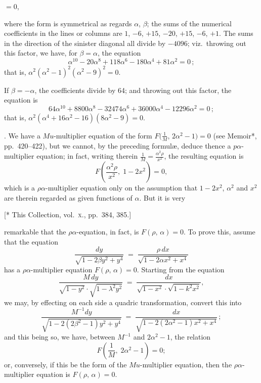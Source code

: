 \documentclass[11pt]{article}
\begin{document}
\noindent\hfill $= 0$,

\medskip

\noindent where the form is symmetrical as regards $\alpha$, $\beta$; the sums of the numerical coefficients in the lines or columns are $1$, $-6$, $+15$, $-20$, $+15$, $-6$, $+1$. The sums in the direction of the sinister diagonal all divide by $-4096$; viz.\ throwing out this factor, we have, for $\beta = \alpha$, the equation
\[
\alpha^{10} - 20\alpha^8 + 118\alpha^6 - 180\alpha^4 + 81\alpha^2 = 0\,;
\]
that is, $\alpha^2(\alpha^2 - 1)^2(\alpha^2 - 9)^2 = 0$.

\medskip

\noindent If $\beta = -\alpha$, the coefficients divide by 64; and throwing out this factor, the equation is
\[
64\alpha^{10} + 8800\alpha^8 - 32474\alpha^6 + 36000\alpha^4 - 12296\alpha^2 = 0\,;
\]
that is, $\alpha^2(\alpha^4 + 16\alpha^2 - 16)(8\alpha^2 - 9) = 0$.

\medskip

. We have a $M u$-multiplier equation of the form $F\!\bigl(\frac{1}{M},\,2\alpha^2 - 1\bigr) = 0$ (see Memoir*, pp.\ 420--422), but we cannot, by the preceding formul\ae{}, deduce thence a $p\alpha$-multiplier equation; in fact, writing therein $\frac{1}{M} = \frac{\alpha^2\rho}{x^2}$, the resulting equation is
\[
F\!\left(\frac{\alpha^2\rho}{x^2},\;1 - 2x^2\right) = 0,
\]
which is a $\rho\alpha$-multiplier equation only on the assumption that $1 - 2x^2$, $\alpha^2$ and $x^2$ are therein regarded as given functions of $\alpha$. But it is very

\hfill {\footnotesize [* This Collection, vol.~\textsc{x}., pp.\ 384, 385.]}

\newpage

\noindent remarkable that the $\rho\alpha$-equation, in fact, is $F(\rho,\,\alpha) = 0$. To prove this, assume that the equation
\[
\frac{dy}{\sqrt{1-2\beta y^2 + y^4}} \;=\; \frac{\rho\,dx}{\sqrt{1-2\alpha x^2 + x^4}}
\]
has a $\rho\alpha$-multiplier equation $F(\rho,\,\alpha) = 0$. Starting from the equation
\[
\frac{M\,dy}{\sqrt{1-y^2}\cdot\sqrt{1-\lambda^2 y^2}} \;=\; \frac{dx}{\sqrt{1-x^2}\cdot\sqrt{1-k^2 x^2}},
\]
we may, by effecting on each side a quadric transformation, convert this into
\[
\frac{M^{-1}dy}{\sqrt{1 - 2(2\beta^2 - 1)y^2 + y^4}} \;=\; \frac{dx}{\sqrt{1 - 2(2\alpha^2 - 1)x^2 + x^4}}\,;
\]
and this being so, we have, between $M^{-1}$ and $2\alpha^2 - 1$, the relation
\[
F\!\left(\frac{1}{M},\;2\alpha^2 - 1\right) = 0;
\]
or, conversely, if this be the form of the $Mu$-multiplier equation, then the $\rho\alpha$-multiplier equation is $F(\rho,\,\alpha) = 0$.
\end{document}
